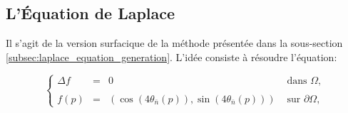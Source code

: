 \subsection{L'\'Equation de Laplace}
\label{subsec:laplace_equation_generation_space}

Il s'agit de la version surfacique de la méthode présentée dans la sous-section \ref{subsec:laplace_equation_generation}. L'idée consiste à résoudre l'équation:

\begin{equation}
\left\{
\begin{array}{lcll}
\Delta f &=& 0 &\mbox{ dans }\Omega,\\\\
f(p)&=&\left(\cos(4\theta_{\bar{n}}(p)), \sin(4\theta_{\bar{n}}(p))\right) & \mbox{ sur } \partial\Omega,
\end{array}
\right.
\label{eqn:frey_vectoriel}
\end{equation}

